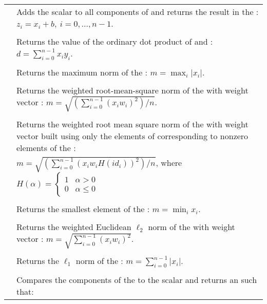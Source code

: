 \begin{xtabular}{|p{\colone}|p{\coltwo}|}
& Adds the  scalar  to all components of  
and returns the result in the  :
$z_i = x_i + b , \: i=0,\ldots,n-1$.
\\[2mm]
 &  \\
& Returns the value of the ordinary dot product of  and :
$d=\sum_{i=0}^{n-1} x_i y_i$.
\\[2mm]
 &  \\
& Returns the maximum norm of the  :
$m = \max_{i} | x_i |$.
\\[2mm]
 &  \\
& Returns the weighted root-mean-square norm of the   with
 weight vector :
$m = \sqrt{\left( \sum_{i=0}^{n-1} (x_i w_i)^2 \right) / n}$.
\\[2mm]
 &  \\
& Returns the weighted root mean square norm of the   with
 weight vector  built using only 
the elements of  corresponding to
nonzero elements of the  :\\
&$m = \sqrt{\left( \sum_{i=0}^{n-1} (x_i w_i H(id_i))^2 \right) / n}$,
where
$
H(\alpha) =
\begin{cases} 
1 & \alpha > 0 \\
0 & \alpha \leq 0
\end{cases}
$
\\[2mm]
 &  \\
& Returns the smallest element of the  :
$m = \min_i x_i $.
\\[2mm]
 &  \\
& Returns the weighted Euclidean $\ell_2$ norm of the  
with  weight vector : 
$m = \sqrt{\sum_{i=0}^{n-1} (x_i w_i)^2}$.
\\[2mm]
 &  \\
& Returns the $\ell_1$ norm of the  :
$m = \sum_{i=0}^{n-1} | x_i |$.
\\[2mm]
 &  \\
& Compares the components of the   to the 
scalar  and returns an   such that:

\end{xtabular}
